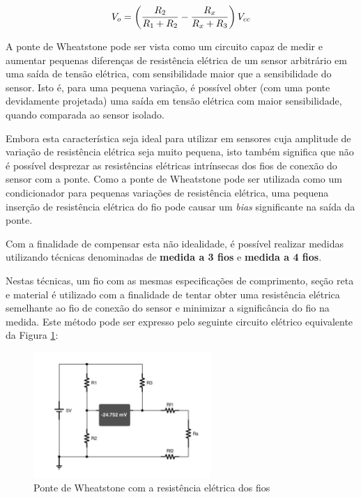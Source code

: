 \documentclass[a4paper]{instrumentacao}
\begin{document}
\begin{equation}
	V_o = \left({{R_2}\over{R_1 + R_2}} - {{R_x}\over{R_x + R_3}}\right)V_{cc}
	\label{eq:wheatstone-vo}
\end{equation}

A ponte de Wheatstone pode ser vista como um circuito capaz de medir e aumentar pequenas diferenças de resistência elétrica de um sensor arbitrário em uma saída de tensão elétrica, com sensibilidade maior que a sensibilidade do sensor. Isto é, para uma pequena variação, é possível obter (com uma ponte devidamente projetada) uma saída em tensão elétrica com maior sensibilidade, quando comparada ao sensor isolado.

Embora esta característica seja ideal para utilizar em sensores cuja amplitude de variação de resistência elétrica seja muito pequena, isto também significa que não é possível desprezar as resistências elétricas intrínsecas dos fios de conexão do sensor com a ponte. Como a ponte de Wheatstone pode ser utilizada como um condicionador para pequenas variações de resistência elétrica, uma pequena inserção de resistência elétrica do fio pode causar um \textit{bias} significante na saída da ponte.

Com a finalidade de compensar esta não idealidade, é possível realizar medidas utilizando técnicas denominadas de \textbf{medida a 3 fios} e \textbf{medida a 4 fios}.

Nestas técnicas, um fio com as mesmas especificações de comprimento, seção reta e material é utilizado com a finalidade de tentar obter uma resistência elétrica semelhante ao fio de conexão do sensor e minimizar a significância do fio na medida. Este método pode ser expresso pelo seguinte circuito elétrico equivalente da Figura \ref{fig:wheatstone-wire-model}:

\begin{figure}[H]
\centering
\includegraphics[width=0.6\textwidth]{Wheatstone-Bridge-WiresModel.pdf}
\caption{Ponte de Wheatstone com a resistência elétrica dos fios}
\label{fig:wheatstone-wire-model}
\end{figure}
\end{document}

